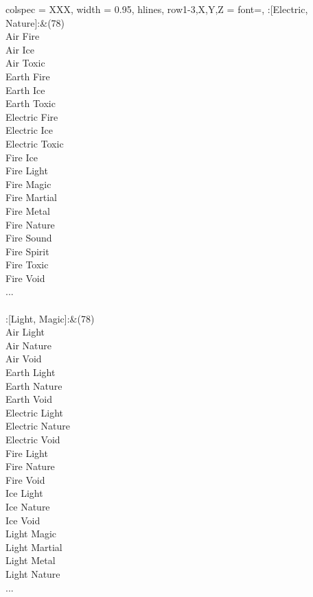 \begin{longtblr}[
	caption = {2v2 Defending Weak},
	label = {2v2-Defending-Weak},
]{
	colspec = {XXX}, width = 0.95\linewidth,
	hlines,
	row{1-3,X,Y,Z} = {font=\bfseries},
}
	:[Electric, Nature]:&{(78)\\
	Air Fire \\
	Air Ice \\
	Air Toxic \\
	Earth Fire \\
	Earth Ice \\
	Earth Toxic \\
	Electric Fire \\
	Electric Ice \\
	Electric Toxic \\
	Fire Ice \\
	Fire Light \\
	Fire Magic \\
	Fire Martial \\
	Fire Metal \\
	Fire Nature \\
	Fire Sound \\
	Fire Spirit \\
	Fire Toxic \\
	Fire Void \\
	...\\
	}\\

	:[Light, Magic]:&{(78)\\
	Air Light \\
	Air Nature \\
	Air Void \\
	Earth Light \\
	Earth Nature \\
	Earth Void \\
	Electric Light \\
	Electric Nature \\
	Electric Void \\
	Fire Light \\
	Fire Nature \\
	Fire Void \\
	Ice Light \\
	Ice Nature \\
	Ice Void \\
	Light Magic \\
	Light Martial \\
	Light Metal \\
	Light Nature \\
	...\\
	}\\


\end{longtblr}
